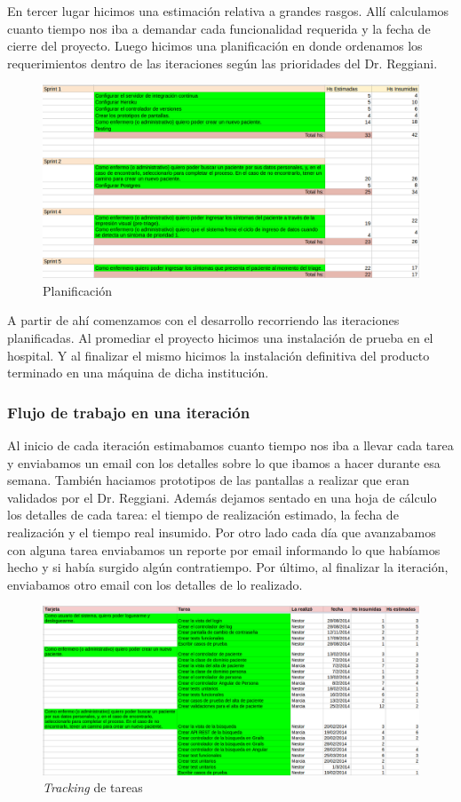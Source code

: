 En tercer lugar hicimos una estimación relativa a grandes rasgos. Allí calculamos cuanto tiempo nos iba a demandar cada funcionalidad requerida y la fecha de cierre del proyecto. Luego hicimos una planificación en donde ordenamos los requerimientos dentro de las iteraciones según las prioridades del Dr. Reggiani.

\begin{figure}[h]
  \centerline{\includegraphics[width=1.2\textwidth]{planificacion.png}}
  \caption{Planificación}
\end{figure}

A partir de ahí comenzamos con el desarrollo recorriendo las iteraciones planificadas. Al promediar el proyecto hicimos una instalación de prueba en el hospital. Y al finalizar el mismo hicimos la instalación definitiva del producto terminado en una máquina de dicha institución.

\subsubsection{Flujo de trabajo en una iteración}
Al inicio de cada iteración estimabamos cuanto tiempo nos iba a llevar cada tarea y enviabamos un email con los detalles sobre lo que ibamos a hacer durante esa semana. También haciamos prototipos de las pantallas a realizar que eran validados por el Dr. Reggiani. Además dejamos sentado en una hoja de cálculo los detalles de cada tarea: el tiempo de realización estimado, la fecha de realización y el tiempo real insumido. Por otro lado cada día que avanzabamos con alguna tarea enviabamos un reporte por email informando lo que habíamos hecho y si había surgido algún contratiempo. Por último, al finalizar la iteración, enviabamos otro email con los detalles de lo realizado.

\begin{figure}[h]
  \centerline{\includegraphics[width=1.2\textwidth]{tracking.png}}
  \caption{\textit{Tracking} de tareas}
\end{figure}

